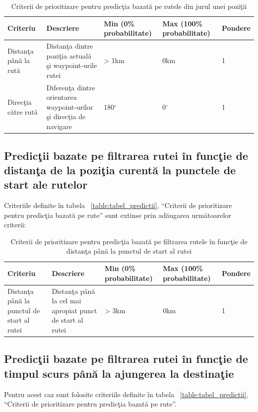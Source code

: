 		\begin{table}[!h]
		\caption{Criterii de prioritizare pentru predicţia bazată pe rutele din jurul unei poziţii}
		\centering
		\begin{tabular}{ | m{} | m{} | m{3,22cm} | m{} | m{} | }
		\hline
		\textbf{Criteriu} & \textbf{Descriere} & \textbf{Min (0\% probabilitate)} & \textbf{Max (100\% probabilitate)} & \textbf{Pondere} \\ 
		\hline
		 Distanţa până la rută & Distanţa dintre poziţia actuală şi waypoint-urile rutei &> 1km & 0km & 1 \\
		\hline
		 Direcţia către rută & Diferenţa dintre orientarea waypoint-urilor şi direcţia de navigare & 180$^{\circ}$ & 0$^{\circ}$ & 1 \\
		\hline
		\end{tabular}
		\end{table}
		
		
		\subsection{Predicţii bazate pe filtrarea rutei în funcţie de distanţa de la poziţia curentă la punctele de start ale rutelor}
		Criteriile definite în tabela ~\ref{table:tabel_predictii}, ``Criterii de prioritizare pentru predicţia bazată pe rute'' sunt extinse prin adăugarea următoarelor criterii:
		
		\begin{table}[!h]
		\caption{Criterii de prioritizare pentru predicţia bazată pe filtrarea rutele în funcţie de distanţa până la punctul de start al rutei}
		\centering
		\begin{tabular}{ | m{} | m{} | m{3,22cm} | m{} | m{} | }
		\hline
		\textbf{Criteriu} & \textbf{Descriere} & \textbf{Min (0\% probabilitate)} & \textbf{Max (100\% probabilitate)} & \textbf{Pondere} \\ 
		\hline
		 Distanţa până la punctul de start al rutei & Distanţa până la cel mai apropiat punct de start al rutei &> 3km & 0km & 1 \\
		\hline
		\end{tabular}
		\end{table}
		
		\subsection{Predicţii bazate pe filtrarea rutei în funcţie de timpul scurs până la ajungerea la destinaţie}
		Pentru acest caz sunt folosite criteriile definite în tabela ~\ref{table:tabel_predictii}, ``Criterii de prioritizare pentru predicţia bazată pe rute''.
		
		
		
		


	
